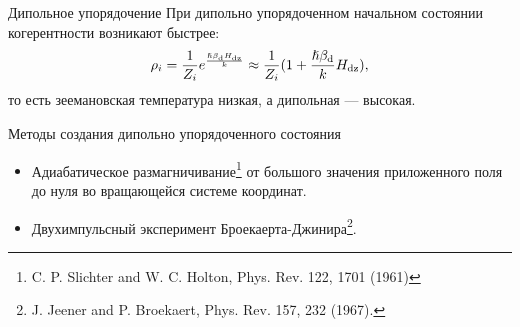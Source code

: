 \begin{frame}{Дипольное упорядочение}
  \alert{При дипольно упорядоченном начальном состоянии когерентности возникают быстрее:}
  $$
  \rho_i = \frac{1}{Z_i} e^\frac{\hslash\beta_\mathrm{d} H_\mathrm{dz}}{k}
  \approx \frac{1}{Z_i}(1 + \frac{\hslash\beta_\mathrm{d}}{k} H_\mathrm{dz}),
  $$
  то есть зеемановская температура низкая, а дипольная --- высокая.
  \begin{block}{Методы создания дипольно упорядоченного состояния}
    \begin{itemize}
      \item  Адиабатическое размагничивание\footnote[frame]{C. P. Slichter and W. C. Holton, Phys. Rev. 122, 1701 (1961)} от большого значения приложенного поля до нуля во вращающейся системе координат.

      \item Двухимпульсный эксперимент Броекаерта-Джинира\footnote[frame]{J. Jeener and P. Broekaert, Phys. Rev. 157, 232 (1967).}.
  \end{itemize}
  \end{block}
\end{frame}

